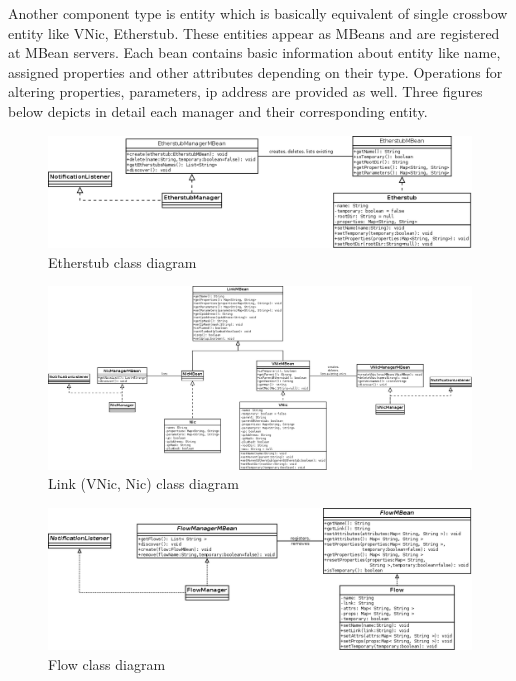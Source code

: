 \documentclass[11pt]{book}
\begin{document}
		Another component type is entity which is basically equivalent of single crossbow entity like VNic, Etherstub.
		These entities appear as MBeans and are registered at MBean servers. Each bean contains basic information about
		entity like name, assigned properties and other attributes depending on their type. Operations for altering
		properties, parameters, ip address are provided as well. Three figures below depicts in detail each manager and
		their corresponding entity.

        \begin{figure}[H]
          \begin{center}
            \includegraphics[width=1.2\textwidth, angle=90]{img/impl/etherstub.png}
          \end{center}
          \caption{Etherstub class diagram}
        \end{figure}        

        \begin{figure}[H]
          \begin{center}
            \includegraphics[width=1.2\textwidth, angle=90]{img/impl/link.png}
          \end{center}
          \caption{Link (VNic, Nic) class diagram}
        \end{figure}        

        \begin{figure}[H]
          \begin{center}
            \includegraphics[width=1.2\textwidth, angle=90]{img/impl/flow.png}
          \end{center}
          \caption{Flow class diagram}
        \end{figure}        
\end{document}
